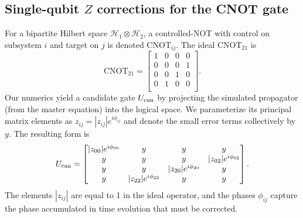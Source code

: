 \subsection{Single-qubit \texorpdfstring{$Z$}{Z} corrections for the CNOT gate}\label{zp:sec:cnot_z_correction}
For a bipartite Hilbert space $\mathcal{H}_1\otimes \mathcal{H}_2$, a controlled-NOT with control on subsystem $i$ and target on $j$ is denoted $\mathrm{CNOT}_{ij}$.
The ideal $\mathrm{CNOT}_{21}$ is
\begin{equation}
 \mathrm{CNOT}_{21}=   \begin{bmatrix}
        1 & 0 & 0 & 0\\
        0 & 0 & 0 & 1\\
        0 & 0 & 1 & 0\\
        0 & 1 & 0 & 0\\
    \end{bmatrix}.
\end{equation}
Our numerics yield a candidate gate $U_{\rm can}$ by projecting the simulated propagator (from the master equation) into the logical space.
We parameterize its principal matrix elements as $z_{ij}= |z_{ij}|e^{i\phi_{ij}}$ and denote the small error terms collectively by $y$.
The resulting form is
\begin{equation}
  {U}_{\rm can} =
 \begin{bmatrix}
  |z_{00}|e^{i\phi_{00}} & y & y & y \\
  y &  y & y & |z_{02}|e^{i\phi_{02}} \\
  y & y & |z_{20}|e^{i\phi_{20}} & y \\
  y & |z_{22}|e^{i\phi_{22}} & y & y
 \end{bmatrix}.
 \end{equation}
The elements $|z_{ij}|$ are equal to 1 in the ideal operator, and the phases $\phi_{ij}$ capture the phase accumulated in time evolution that must be corrected.

